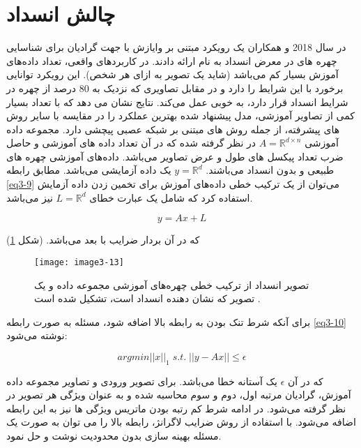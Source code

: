 \section{چالش انسداد}
در سال 2018  و همکاران \cite{WU2018256} یک رویکرد مبتنی بر وایازش  با جهت گرادیان برای شناسایی چهره های در معرض انسداد  به نام   ارائه دادند. در کاربردهای واقعی، تعداد داده‌های آموزش بسیار کم می‌باشد (شاید یک تصویر به ازای هر شخص). این رویکرد توانایی برخورد با این شرایط را دارد و در مقابل تصاویری که نزدیک به 80 درصد از چهره در شرایط انسداد قرار دارد، به خوبی عمل می‌کند. نتایج نشان می دهد که با تعداد بسیار کمی از تصاویر آموزشی، مدل پیشنهاد شده  بهترین عملکرد را در مقایسه با سایر روش های پیشرفته، از جمله روش های مبتنی بر شبکه عصبی پیچشی دارد. مجموعه داده آموزشی $A=\mathbb{R}^{d\times n}$ در نظر گرفته شده که در آن  تعداد داده های آموزشی و  حاصل ضرب تعداد پیکسل های طول و عرض تصاویر می‌باشد. داده‌های آموزشی چهره های طبیعی و بدون انسداد می‌باشند. $y=\mathbb{R}^d$ یک داده آزمایشی می‌باشد. مطابق رابطه \ref{eq3-9} می‌توان از یک ترکیب خطی داده‌های آموزش برای تخمین زدن داده آزمایش استفاده کرد که شامل یک عبارت خطای $L=\mathbb{R}^d$ نیز می‌باشد.
 
\begin{equation}
\label{eq3-9}
y=Ax+L
\end{equation}

\noindent‏
که در آن  بردار ضرایب با  بعد می‌باشد. (شکل \ref{image3-13})

\begin{figure}[h]
\centering
  \texttt{[image: image3-13]}
  \caption{تصویر انسداد از ترکیب خطی چهره‌های آموزشی مجموعه داده و یک تصویر  که نشان دهنده انسداد است، تشکیل شده است \cite{WU2018256}.}
  \label{image3-13}
\end{figure}

\noindent
برای آنکه شرط تنک بودن به رابطه بالا اضافه شود، مسئله به صورت رابطه \ref{eq3-10} نوشته می‌شود:

\begin{equation}
\label{eq3-10}
arg min ||x||_1 \;  s.t. \; ||y - Ax|| \leq \epsilon 	
\end{equation}

\noindent‏
که در آن $\epsilon$ یک آستانه خطا می‌باشد. برای تصویر ورودی و تصاویر مجموعه داده آموزش، گرادیان مرتبه اول، دوم و سوم محاسبه شده و به عنوان ویژگی هر تصویر در نظر گرفته می‌شود. در ادامه شرط کم رتبه بودن ماتریس ویژگی ها نیز به این رابطه اضافه می‌شود. با استفاده از روش ضرایب لاگرانژ، رابطه بالا را می توان به صورت یک مسئله بهینه سازی بدون محدودیت نوشت و حل نمود.

